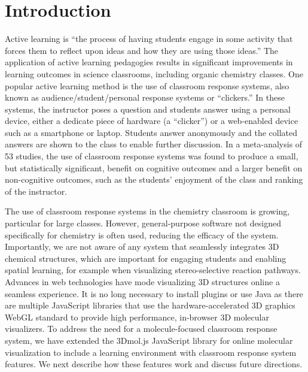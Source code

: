 \documentclass[journal=jceda8,manuscript=article]{achemso}
\begin{document}
\section{Introduction}
Active learning is ``the process of having students engage in some activity that forces them to reflect upon ideas and how they are using those ideas.''\cite{collins2011greenwood}  The application of active learning pedagogies results in significant improvements in learning outcomes in science classrooms\cite{michael2006s,deslauriers2011improved,armbruster2009active}, including organic chemistry classes\cite{jeske2019collaborative,decicco2019clickers,webbased}.  One popular active learning method is the use of classroom response systems\cite{martyn2007clickers}, also known as audience/student/personal response systems or ``clickers.''  In these systems, the instructor poses a question and students answer using a personal device, either a dedicate piece of hardware (a ``clicker'') or a web-enabled device such as a smartphone or laptop\cite{webbased}.  Students answer anonymously and the collated answers are shown to the class to enable further discussion.  In a meta-analysis\cite{hunsu2016meta} of 53 studies, the use of classroom response systems was found to produce a small, but statistically significant, benefit on cognitive outcomes and a larger benefit on non-cognitive outcomes, such as the students' enjoyment of the class and ranking of the instructor.

The use of classroom response systems in the chemistry classroom is growing, particular for large classes\cite{gibbons2017chasm,woelk2008optimizing}.  However, general-purpose software not designed specifically for chemistry is often used, reducing the efficacy of the system\cite{webbased}.  Importantly, we are not aware of any system that seamlessly integrates 3D chemical structures, which are important for engaging students and enabling spatial learning\cite{fatemah2020interactive}, for example when visualizing stereo-selective reaction pathways\cite{o2016creating}.  Advances in web technologies have mode visualizing 3D structures online a seamless experience.  It is no long necessary to install plugins\cite{Charistos} or use Java\cite{hanson2010jmol} as there are multiple JavaScript libraries that use the hardware-accelerated 3D graphics WebGL standard to provide high performance, in-browser 3D molecular visualizers\cite{rego20153dmol,rose2015ngl,molstar,wang2020icn3d}.
To address the need for a molecule-focused classroom response system, we have extended the 3Dmol.js\cite{rego20153dmol} JavaScript library for online molecular visualization to include a learning environment with classroom response system features.  We next describe how these features work and discuss future directions.
\end{document}

